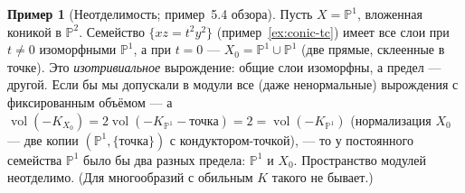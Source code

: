 \documentclass[11pt,a4paper]{article}
\theoremstyle{plain}
\theoremstyle{definition}
\newtheorem{example}[theorem]{Пример}
\theoremstyle{remark}
\newcommand{\PP}{\mathbb{P}}
\DeclareMathOperator{\vol}{vol}
\begin{document}
\begin{example}[Неотделимость; пример~5.4 обзора]\label{ex:nonseparated}
Пусть $X=\PP^1$, вложенная коникой в $\PP^2$. Семейство $\{xz=t^2y^2\}$ (пример~\ref{ex:conic-tc})
имеет все слои при $t\ne0$ изоморфными $\PP^1$, а при $t=0$ --- $X_0=\PP^1\cup\PP^1$ (две прямые,
склеенные в точке). Это \emph{изотривиальное} вырождение: общие слои изоморфны, а предел ---
другой. Если бы мы допускали в модули все (даже ненормальные) вырождения с фиксированным объёмом
--- а $\vol(-K_{X_0})=2\vol(-K_{\PP^1}-\text{точка})=2=\vol(-K_{\PP^1})$ (нормализация $X_0$ --- две
копии $(\PP^1,\{\text{точка}\})$ с кондуктором-точкой), --- то у постоянного семейства $\PP^1$ было бы
два разных предела: $\PP^1$ и $X_0$. Пространство модулей неотделимо. (Для многообразий с обильным
$K$ такого не бывает.)
\end{example}
\end{document}
